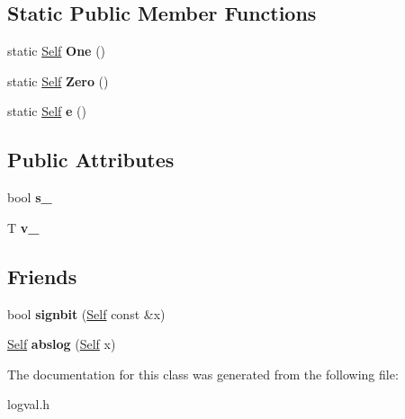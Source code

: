 \subsection*{Static Public Member Functions}
\begin{DoxyCompactItemize}
\item 
\mbox{\label{class_log_val_a5914d577a7f550b241dad4ceeae8f2c3}} 
static \mbox{\hyperlink{class_log_val}{Self}} {\bfseries One} ()
\item 
\mbox{\label{class_log_val_a78c1be25c4a94647d42872ef94f19c99}} 
static \mbox{\hyperlink{class_log_val}{Self}} {\bfseries Zero} ()
\item 
\mbox{\label{class_log_val_a5dc0a49ba546efb7cc48298e280e687a}} 
static \mbox{\hyperlink{class_log_val}{Self}} {\bfseries e} ()
\end{DoxyCompactItemize}
\subsection*{Public Attributes}
\begin{DoxyCompactItemize}
\item 
\mbox{\label{class_log_val_a8956dd17f573ee9dfe013b34cd1207d1}} 
bool {\bfseries s\+\_\+}
\item 
\mbox{\label{class_log_val_a5db618483f07a01511be154ff3457fb7}} 
T {\bfseries v\+\_\+}
\end{DoxyCompactItemize}
\subsection*{Friends}
\begin{DoxyCompactItemize}
\item 
\mbox{\label{class_log_val_ab9f25ebb5c792a5dc7cf5df15dd33903}} 
bool {\bfseries signbit} (\mbox{\hyperlink{class_log_val}{Self}} const \&x)
\item 
\mbox{\label{class_log_val_a781d65689a8b27c1b38fd5dad7d4a0a4}} 
\mbox{\hyperlink{class_log_val}{Self}} {\bfseries abslog} (\mbox{\hyperlink{class_log_val}{Self}} x)
\end{DoxyCompactItemize}


The documentation for this class was generated from the following file\+:\begin{DoxyCompactItemize}
\item 
logval.\+h\end{DoxyCompactItemize}
